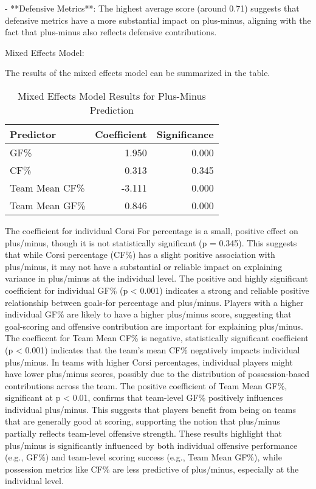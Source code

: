 \documentclass[12pt]{article}
\begin{document}
- **Defensive Metrics**: The highest average score (around 0.71) suggests that defensive metrics have a more substantial impact on 
plus-minus, aligning with the fact that plus-minus also reflects defensive contributions.

Mixed Effects Model:

The results of the mixed effects model can be summarized in the table.

\begin{table}[tbp]
  \caption{Mixed Effects Model Results for Plus-Minus Prediction}
  \label{tab:mixed-effects}
  \centering
  \begin{tabular}{lrr}
    \toprule
    Predictor & Coefficient & Significance \\ 
    \midrule
    GF\% & 1.950 & 0.000 \\
    CF\% & 0.313 & 0.345 \\ 
    Team Mean CF\% & -3.111 & 0.000 \\ 
    Team Mean GF\% & 0.846 & 0.000 \\ 
    \bottomrule
\end{tabular}
\end{table}

The coefficient for individual Corsi For percentage is a small, positive effect on plus/minus, though it is not statistically significant 
(p = 0.345). This suggests that while Corsi percentage (CF\%) has a slight positive association with plus/minus, it may not have a 
substantial or reliable impact on explaining variance in plus/minus at the individual level. The positive and highly significant 
coefficient for individual GF\% (p < 0.001) indicates a strong and reliable positive relationship between goals-for percentage and plus/minus. 
Players with a higher individual GF\% are likely to have a higher plus/minus score, suggesting that goal-scoring and offensive contribution 
are important for explaining plus/minus. The coefficent for Team Mean CF\% is negative, statistically significant coefficient (p < 0.001) 
indicates that the team’s mean CF\% negatively impacts individual plus/minus. In teams with higher Corsi percentages, individual players 
might have lower plus/minus scores, possibly due to the distribution of possession-based contributions across the team. The positive 
coefficient of Team Mean GF\%, significant at p < 0.01, confirms that team-level GF\% positively influences individual plus/minus. This 
suggests that players benefit from being on teams that are generally good at scoring, supporting the notion that plus/minus partially 
reflects team-level offensive strength. These results highlight that plus/minus is significantly influenced by both individual offensive 
performance (e.g., GF\%) and team-level scoring success (e.g., Team Mean GF\%), while possession metrics like CF\% are less predictive of 
plus/minus, especially at the individual level.
\end{document}
